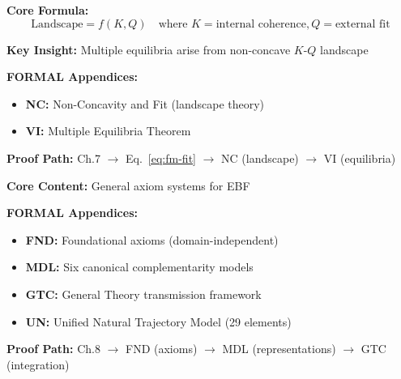 \begin{tcolorbox}[colback=gray!3!white, colframe=gray!60!black,
    title=\textbf{Chapter 7: Fit and Non-Concavity}]

\textbf{Core Formula:}
\begin{equation}
\text{Landscape} = f(K, Q) \quad \text{where } K = \text{internal coherence}, Q = \text{external fit}
\label{eq:fm-fit}
\end{equation}

\textbf{Key Insight:} Multiple equilibria arise from non-concave $K$-$Q$ landscape

\textbf{FORMAL Appendices:}
\begin{itemize}[nosep]
    \item \textbf{NC:} Non-Concavity and Fit (landscape theory)
    \item \textbf{VI:} Multiple Equilibria Theorem
\end{itemize}

\textbf{Proof Path:} Ch.7 $\rightarrow$ Eq.~\ref{eq:fm-fit} $\rightarrow$ NC (landscape) $\rightarrow$ VI (equilibria)

\end{tcolorbox}

\begin{tcolorbox}[colback=gray!3!white, colframe=gray!60!black,
    title=\textbf{Chapter 8: Mathematical Foundations}]

\textbf{Core Content:} General axiom systems for EBF

\textbf{FORMAL Appendices:}
\begin{itemize}[nosep]
    \item \textbf{FND:} Foundational axioms (domain-independent)
    \item \textbf{MDL:} Six canonical complementarity models
    \item \textbf{GTC:} General Theory transmission framework
    \item \textbf{UN:} Unified Natural Trajectory Model (29 elements)
\end{itemize}

\textbf{Proof Path:} Ch.8 $\rightarrow$ FND (axioms) $\rightarrow$ MDL (representations) $\rightarrow$ GTC (integration)

\end{tcolorbox}

